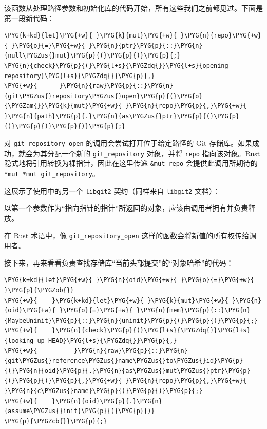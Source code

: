 该函数从处理路径参数和初始化库的代码开始，所有这些我们之前都见过。下面是第一段新代码：

\begin{Verbatim}[commandchars=\\\{\},breaklines=true,breakanywhere=true,fontsize=\codefont,xleftmargin=17bp]
\PYG{k+kd}{let}\PYG{+w}{ }\PYG{k}{mut}\PYG{+w}{ }\PYG{n}{repo}\PYG{+w}{ }\PYG{o}{=}\PYG{+w}{ }\PYG{n}{ptr}\PYG{p}{::}\PYG{n}{null\PYGZus{}mut}\PYG{p}{(}\PYG{p}{)}\PYG{p}{;}
\PYG{n}{check}\PYG{p}{(}\PYG{l+s}{\PYGZdq{}}\PYG{l+s}{opening repository}\PYG{l+s}{\PYGZdq{}}\PYG{p}{,}
\PYG{+w}{      }\PYG{n}{raw}\PYG{p}{::}\PYG{n}{git\PYGZus{}repository\PYGZus{}open}\PYG{p}{(}\PYG{o}{\PYGZam{}}\PYG{k}{mut}\PYG{+w}{ }\PYG{n}{repo}\PYG{p}{,}\PYG{+w}{ }\PYG{n}{path}\PYG{p}{.}\PYG{n}{as\PYGZus{}ptr}\PYG{p}{(}\PYG{p}{)}\PYG{p}{)}\PYG{p}{)}\PYG{p}{;}
\end{Verbatim}

对 \texttt{git\_repository\_open} 的调用会尝试打开位于给定路径的 Git 存储库。如果成功，就会为其分配一个新的 \texttt{git\_repository} 对象，并将 \texttt{repo} 指向该对象。Rust 隐式地将引用转换为裸指针，因此在这里传递 \texttt{\&mut repo} 会提供此调用所期待的 \texttt{*mut *mut git\_repository}。

这展示了使用中的另一个 \texttt{libgit2} 契约（同样来自 \texttt{libgit2} 文档）：

\begin{myNote}
以第一个参数作为“指向指针的指针”所返回的对象，应该由调用者拥有并负责释放。
\end{myNote}

在 Rust 术语中，像 \texttt{git\_repository\_open} 这样的函数会将新值的所有权传给调用者。

接下来，再来看看负责查找存储库“当前头部提交”的“对象哈希”的代码：

\begin{Verbatim}[commandchars=\\\{\},breaklines=true,breakanywhere=true,fontsize=\codefont,xleftmargin=17bp]
\PYG{k+kd}{let}\PYG{+w}{ }\PYG{n}{oid}\PYG{+w}{ }\PYG{o}{=}\PYG{+w}{ }\PYG{p}{\PYGZob{}}
\PYG{+w}{    }\PYG{k+kd}{let}\PYG{+w}{ }\PYG{k}{mut}\PYG{+w}{ }\PYG{n}{oid}\PYG{+w}{ }\PYG{o}{=}\PYG{+w}{ }\PYG{n}{mem}\PYG{p}{::}\PYG{n}{MaybeUninit}\PYG{p}{::}\PYG{n}{uninit}\PYG{p}{(}\PYG{p}{)}\PYG{p}{;}
\PYG{+w}{    }\PYG{n}{check}\PYG{p}{(}\PYG{l+s}{\PYGZdq{}}\PYG{l+s}{looking up HEAD}\PYG{l+s}{\PYGZdq{}}\PYG{p}{,}
\PYG{+w}{          }\PYG{n}{raw}\PYG{p}{::}\PYG{n}{git\PYGZus{}reference\PYGZus{}name\PYGZus{}to\PYGZus{}id}\PYG{p}{(}\PYG{n}{oid}\PYG{p}{.}\PYG{n}{as\PYGZus{}mut\PYGZus{}ptr}\PYG{p}{(}\PYG{p}{)}\PYG{p}{,}\PYG{+w}{ }\PYG{n}{repo}\PYG{p}{,}\PYG{+w}{ }\PYG{n}{c\PYGZus{}name}\PYG{p}{)}\PYG{p}{)}\PYG{p}{;}
\PYG{+w}{    }\PYG{n}{oid}\PYG{p}{.}\PYG{n}{assume\PYGZus{}init}\PYG{p}{(}\PYG{p}{)}
\PYG{p}{\PYGZcb{}}\PYG{p}{;}
\end{Verbatim}

